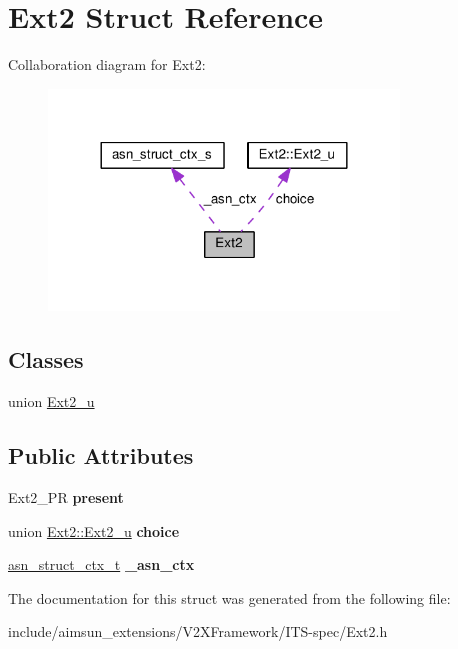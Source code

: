 \hypertarget{structExt2}{}\section{Ext2 Struct Reference}
\label{structExt2}


Collaboration diagram for Ext2\+:\nopagebreak
\begin{figure}[H]
\begin{center}
\leavevmode
\includegraphics[width=264pt]{structExt2__coll__graph}
\end{center}
\end{figure}
\subsection*{Classes}
\begin{DoxyCompactItemize}
\item 
union \hyperlink{unionExt2_1_1Ext2__u}{Ext2\+\_\+u}
\end{DoxyCompactItemize}
\subsection*{Public Attributes}
\begin{DoxyCompactItemize}
\item 
Ext2\+\_\+\+PR {\bfseries present}\hypertarget{structExt2_ab1aed038e84cd8b55fbee22fd4764a60}{}\label{structExt2_ab1aed038e84cd8b55fbee22fd4764a60}

\item 
union \hyperlink{unionExt2_1_1Ext2__u}{Ext2\+::\+Ext2\+\_\+u} {\bfseries choice}\hypertarget{structExt2_a1ce4dd441057308d9650404d63b59e2a}{}\label{structExt2_a1ce4dd441057308d9650404d63b59e2a}

\item 
\hyperlink{structasn__struct__ctx__s}{asn\+\_\+struct\+\_\+ctx\+\_\+t} {\bfseries \+\_\+asn\+\_\+ctx}\hypertarget{structExt2_a1f7d6d9c4211433ff111d06f56285444}{}\label{structExt2_a1f7d6d9c4211433ff111d06f56285444}

\end{DoxyCompactItemize}


The documentation for this struct was generated from the following file\+:\begin{DoxyCompactItemize}
\item 
include/aimsun\+\_\+extensions/\+V2\+X\+Framework/\+I\+T\+S-\/spec/Ext2.\+h\end{DoxyCompactItemize}
